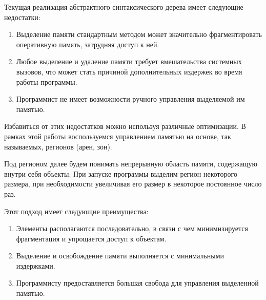 Текущая реализация абстрактного синтаксического дерева имеет следующие
недостатки: 

\begin{enumerate}
    \item Выделение памяти стандартным методом может значительно фрагментировать
    оперативную память, затрудняя доступ к ней. 
    \item Любое выделение и удаление памяти требует вмешательства системных
    вызовов, что может стать причиной дополнительных издержек во время работы
    программы.
    \item Программист не имеет возможности ручного управления выделяемой им
    памятью.
\end{enumerate} 

Избавиться от этих недостатков можно используя различные оптимизации. В рамках
этой работы воспользуемся управлением памятью на основе, так называемых,
регионов (арен, зон)\cite{WangMemory}.

Под регионом далее будем понимать непрерывную область памяти, содержащую внутри
себя объекты. При запуске программы выделим регион некоторого размера, при
необходимости увеличивая его размер в некоторое постоянное число раз.

Этот подход имеет следующие преимущества:

\begin{enumerate}
    \item Элементы располагаются последовательно, в связи с чем минимизируется
    фрагментация и упрощается доступ к объектам.
    \item Выделение и освобождение памяти выполняется с минимальными издержками.
    \item Программисту предоставляется большая свобода для управления выделенной
    памятью.
\end{enumerate}
